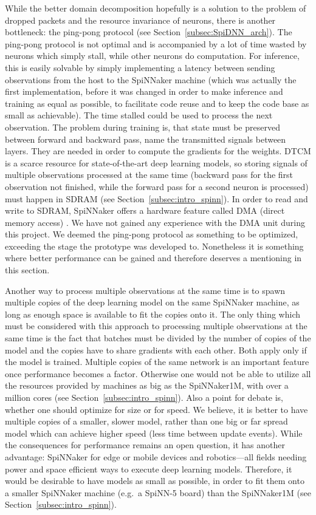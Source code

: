 \documentclass[]{article}
\begin{document}
While the better domain decomposition hopefully is a solution
to the problem of dropped packets and the resource invariance of
neurons, there is another bottleneck: the ping-pong protocol
(see Section~\ref{subsec:SpiDNN_arch}).
The ping-pong protocol is not optimal and is accompanied by a lot
of time wasted by neurons which simply stall, while other neurons
do computation.
For inference, this is easily solvable by simply implementing a
latency between sending observations from the host to the SpiNNaker
machine (which was actually the first implementation, before it was
changed in order to make inference and training as equal as possible,
to facilitate code reuse and to keep the code base as small as
achievable).
The time stalled could be used to process the next observation.
The problem during training is, that state must be preserved between
forward and backward pass, name the transmitted signals between
layers.
They are needed in order to compute the gradients for the weights.
DTCM is a scarce resource for state-of-the-art deep learning models,
so storing signals of multiple observations processed at the same time
(backward pass for the first observation not finished, while the
forward pass for a second neuron is processed) must happen in SDRAM
(see Section~\ref{subsec:intro_spinn}).
In order to read and write to SDRAM, SpiNNaker offers a hardware
feature called DMA (direct memory access) \citep{furber_et_al_2020}.
We have not gained any experience with the DMA unit during this
project.
We deemed the ping-pong protocol as something to be optimized,
exceeding the stage the prototype was developed to.
Nonetheless it is something where better performance can be gained
and therefore deserves a mentioning in this section.

Another way to process multiple observations at the same time is
to spawn multiple copies of the deep learning model on the same
SpiNNaker machine, as long as enough space is available to fit the
copies onto it.
The only thing which must be considered with this approach to
processing multiple observations at the same time is the
fact that batches must be divided by the number of copies of the model
and the copies have to share gradients with each other.
Both apply only if the model is trained.
Multiple copies of the same network is an important feature once
performance becomes a factor.
Otherwise one would not be able to utilize all the resources provided
by machines as big as the SpiNNaker1M, with over a million cores (see
Section~\ref{subsec:intro_spinn}).
Also a point for debate is, whether one should optimize for size or
for speed.
We believe, it is better to have multiple copies of a smaller, slower
model, rather than one big or far spread model which can achieve
higher speed (less time between update events).
While the consequences for performance remains an open question,
it has another advantage: SpiNNaker for edge or mobile devices and
robotics---all fields needing power and space efficient ways to
execute deep learning models.
Therefore, it would be desirable to have models as small as possible,
in order to fit them onto a smaller SpiNNaker machine (e.g.\ a
SpiNN-5 board) than the SpiNNaker1M
(see Section~\ref{subsec:intro_spinn}).
\end{document}
